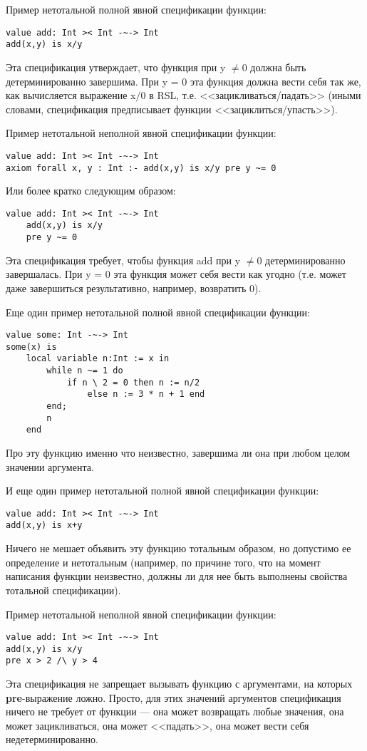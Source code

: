 Пример нетотальной полной явной спецификации функции:
\begin{lstlisting}
value add: Int >< Int -~-> Int
add(x,y) is x/y
\end{lstlisting}
Эта спецификация утверждает, что функция при y $\neq 0$ должна быть детерминированно завершима. При y = 0 эта функция должна вести себя так же, как вычисляется выражение x$/0$ в RSL, т.е. <<зацикливаться/падать>> (иными словами, спецификация предписывает функции <<зациклиться/упасть>>).

Пример нетотальной неполной явной спецификации функции:
\begin{lstlisting}
value add: Int >< Int -~-> Int
axiom forall x, y : Int :- add(x,y) is x/y pre y ~= 0
\end{lstlisting}
Или более кратко следующим образом:
\begin{lstlisting}
value add: Int >< Int -~-> Int
    add(x,y) is x/y
    pre y ~= 0
\end{lstlisting}

Эта спецификация требует, чтобы функция add при y $\neq 0$ детерминированно завершалась. При y = 0 эта функция может себя вести как угодно (т.е. может даже завершиться результативно, например, возвратить 0).

Еще один пример нетотальной полной явной спецификации функции:
\begin{lstlisting}
value some: Int -~-> Int
some(x) is
    local variable n:Int := x in
        while n ~= 1 do
            if n \ 2 = 0 then n := n/2
                else n := 3 * n + 1 end
        end;
        n
    end
\end{lstlisting}
Про эту функцию именно что неизвестно, завершима ли она при любом целом значении аргумента.

И еще один пример нетотальной полной явной спецификации функции:
\begin{lstlisting}
value add: Int >< Int -~-> Int
add(x,y) is x+y
\end{lstlisting}
Ничего не мешает объявить эту функцию тотальным образом, но допустимо ее определение и нетотальным (например, по причине того, что на момент написания функции неизвестно, должны ли для нее быть выполнены свойства тотальной спецификации).

Пример нетотальной неполной явной спецификации функции:
\begin{lstlisting}
value add: Int >< Int -~-> Int
add(x,y) is x/y
pre x > 2 /\ y > 4
\end{lstlisting}

Эта спецификация не запрещает вызывать функцию с аргументами, на которых \textbf{pre}-выражение ложно. Просто, для этих значений аргументов спецификация ничего не требует от функции --- она может возвращать любые значения, она может зацикливаться, она может <<падать>>, она может вести себя недетерминированно. 